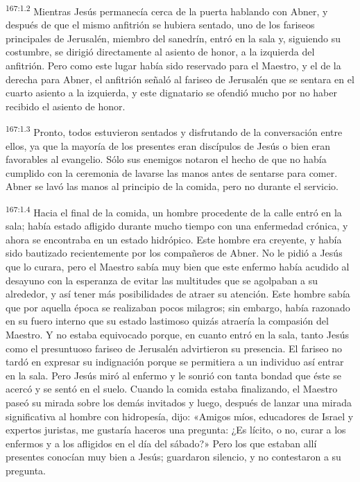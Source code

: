 \par 
\textsuperscript{167:1.2} Mientras Jesús permanecía cerca de la puerta hablando con Abner, y después de que el mismo anfitrión se hubiera sentado, uno de los fariseos principales de Jerusalén, miembro del sanedrín, entró en la sala y, siguiendo su costumbre, se dirigió directamente al asiento de honor, a la izquierda del anfitrión. Pero como este lugar había sido reservado para el Maestro, y el de la derecha para Abner, el anfitrión señaló al fariseo de Jerusalén que se sentara en el cuarto asiento a la izquierda, y este dignatario se ofendió mucho por no haber recibido el asiento de honor.

\par 
\textsuperscript{167:1.3} Pronto, todos estuvieron sentados y disfrutando de la conversación entre ellos, ya que la mayoría de los presentes eran discípulos de Jesús o bien eran favorables al evangelio. Sólo sus enemigos notaron el hecho de que no había cumplido con la ceremonia de lavarse las manos antes de sentarse para comer. Abner se lavó las manos al principio de la comida, pero no durante el servicio.

\par 
\textsuperscript{167:1.4} Hacia el final de la comida, un hombre procedente de la calle entró en la sala; había estado afligido durante mucho tiempo con una enfermedad crónica, y ahora se encontraba en un estado hidrópico. Este hombre era creyente, y había sido bautizado recientemente por los compañeros de Abner. No le pidió a Jesús que lo curara, pero el Maestro sabía muy bien que este enfermo había acudido al desayuno con la esperanza de evitar las multitudes que se agolpaban a su alrededor, y así tener más posibilidades de atraer su atención. Este hombre sabía que por aquella época se realizaban pocos milagros; sin embargo, había razonado en su fuero interno que su estado lastimoso quizás atraería la compasión del Maestro. Y no estaba equivocado porque, en cuanto entró en la sala, tanto Jesús como el presuntuoso fariseo de Jerusalén advirtieron su presencia. El fariseo no tardó en expresar su indignación porque se permitiera a un individuo así entrar en la sala. Pero Jesús miró al enfermo y le sonrió con tanta bondad que éste se acercó y se sentó en el suelo. Cuando la comida estaba finalizando, el Maestro paseó su mirada sobre los demás invitados y luego, después de lanzar una mirada significativa al hombre con hidropesía, dijo: «Amigos míos, educadores de Israel y expertos juristas, me gustaría haceros una pregunta: ¿Es lícito, o no, curar a los enfermos y a los afligidos en el día del sábado?» Pero los que estaban allí presentes conocían muy bien a Jesús; guardaron silencio, y no contestaron a su pregunta.

